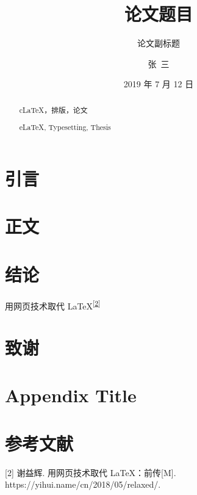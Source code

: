 \documentclass{thesis}
\title{论文题目}
\subtitle{论文副标题}
\author{张\ 三}
\date{2019 年 7 月 12 日}
\begin{document}
\frontmatter
\maketitle

\begin{abstract}{c}{\LaTeX{}，排版，论文}
\zhlipsum[1]
\end{abstract}

\begin{abstract}{e}{\LaTeX{}, Typesetting, Thesis}
\lipsum[1]
\end{abstract}
 
\tableofcontents

\mainmatter

\chapter{引言}
\zhlipsum[1-2]

\chapter{正文}
\zhlipsum[1-15]

\chapter{结论}
用网页技术取代 \LaTeX{}\textsuperscript{{[}\hyperlink{ref-weborlatex}{2}{]}}

\backmatter

\chapter*{致谢}
\zhlipsum[1]

\appendix
\chapter{Appendix Title}
\zhlipsum[1]

\chapter*{参考文献}
\leavevmode\hypertarget{ref-weborlatex}{}%
{[}2{]} 谢益辉. 用网页技术取代 LaTeX：前传{[}M{]}.
https://yihui.name/cn/2018/05/relaxed/.
\end{document}
